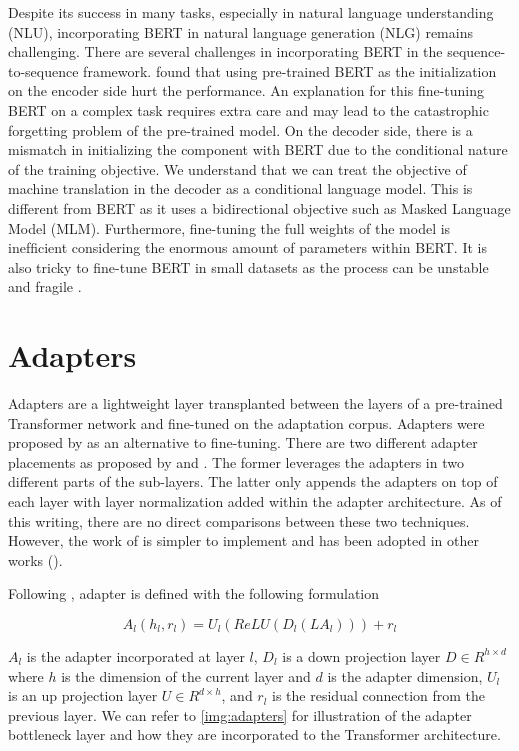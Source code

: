 Despite its success in many tasks, especially in natural language understanding (NLU), incorporating BERT in natural language generation (NLG) remains challenging. There are several challenges in incorporating BERT in the sequence-to-sequence framework. \cite{Zhu2020IncorporatingBI} found that using pre-trained BERT as the initialization on the encoder side hurt the performance. An explanation for this fine-tuning BERT on a complex task requires extra care and may lead to the catastrophic forgetting problem \cite{mccloskey1989catastrophic} of the pre-trained model. On the decoder side, there is a mismatch in initializing the component with BERT due to the conditional nature of the training objective. We understand that we can treat the objective of machine translation in the decoder as a conditional language model. This is different from BERT as it uses a bidirectional objective such as Masked Language Model (MLM). Furthermore, ﬁne-tuning the full weights of the model is inefﬁcient considering the enormous amount of parameters within BERT. It is also tricky to fine-tune BERT in small datasets as the process can be unstable and fragile \cite{Lee2020MixoutER}.

\section{Adapters}
\label{sec:bm_adapters}
Adapters are a lightweight layer transplanted between the layers of a pre-trained Transformer network and fine-tuned on the adaptation corpus. Adapters were proposed by \cite{houlsby2019parameter} as an alternative to fine-tuning. There are two different adapter placements as proposed by \cite{bapna2019simple} and \cite{houlsby2019parameter}. The former leverages the adapters in two different parts of the sub-layers. The latter only appends the adapters on top of each layer with layer normalization added within the adapter architecture. As of this writing, there are no direct comparisons between these two techniques. However, the work of \cite{bapna2019simple} is simpler to implement and has been adopted in other works (\cite{pfeiffer2020madx,ruckle2020adapterdrop,pfeiffer2021adapterfusion}).

Following \cite{pfeiffer2020madx}, adapter is defined with the following formulation

$$A_l(h_l, r_l) = U_l(ReLU(D_l(LA_l))) + r_l $$

$A_l$ is the adapter incorporated at layer $l$, $D_l$ is a down projection layer $D \in R^{h \times d}$ where $h$ is the dimension of the current layer and $d$ is the adapter dimension, $U_l$ is an up projection layer $U \in R^{d \times h}$, and $r_l$ is the residual connection from the previous layer. We can refer to \ref{img:adapters} for illustration of the adapter bottleneck layer and how they are incorporated to the Transformer architecture.

